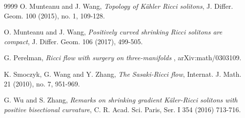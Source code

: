\documentclass[12pt]{amsart}%
\numberwithin{equation}{section}
\begin{document}
\begin{thebibliography}{9999}
O. Munteanu and J. Wang, \textit{Topology of K\"{a}hler
Ricci solitons}, J. Differ. Geom. 100 (2015), no. 1, 109-128.

O. Munteanu and J. Wang, \textit{Positively curved shrinking
Ricci solitons are compact}, J. Differ. Geom. 106 (2017), 499-505.

G. Perelman, \textit{Ricci flow with surgery on three-manifolds}%
, arXiv:math/0303109.

K. Smoczyk, G. Wang and Y. Zhang, \textit{The Sasaki-Ricci
flow}, Internat. J. Math. 21 (2010), no. 7, 951-969.

G. Wu and S. Zhang, \textit{Remarks on shrinking gradient
K\"{a}ler-Ricci solitons with positive bisectional curvature}, C. R. Acad.
Sci. Paris, Ser. I 354 (2016) 713-716.
\end{thebibliography}
\end{document}
